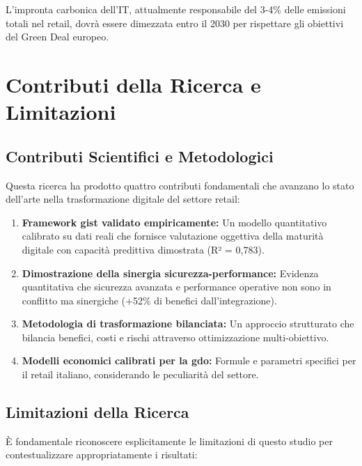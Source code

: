 L'impronta carbonica dell'IT, attualmente responsabile del 3-4\% delle emissioni totali nel retail, dovrà essere dimezzata entro il 2030 per rispettare gli obiettivi del Green Deal europeo.

\section{\texorpdfstring{Contributi della Ricerca e Limitazioni}{5.6 - Contributi della Ricerca e Limitazioni}}
\label{sec:5.6}

\subsection{\texorpdfstring{Contributi Scientifici e Metodologici}{5.6.1 - Contributi Scientifici e Metodologici}}
\label{subsec:5.6.1}

Questa ricerca ha prodotto quattro contributi fondamentali che avanzano lo stato dell'arte nella trasformazione digitale del settore retail:

\begin{enumerate}
\item \textbf{Framework \gls{gist} validato empiricamente:} Un modello quantitativo calibrato su dati reali che fornisce valutazione oggettiva della maturità digitale con capacità predittiva dimostrata (R² = 0,783).

\item \textbf{Dimostrazione della sinergia sicurezza-performance:} Evidenza quantitativa che sicurezza avanzata e performance operative non sono in conflitto ma sinergiche (+52\% di benefici dall'integrazione).

\item \textbf{Metodologia di trasformazione bilanciata:} Un approccio strutturato che bilancia benefici, costi e rischi attraverso ottimizzazione multi-obiettivo.

\item \textbf{Modelli economici calibrati per la \gls{gdo}:} Formule e parametri specifici per il retail italiano, considerando le peculiarità del settore.
\end{enumerate}

\subsection{\texorpdfstring{Limitazioni della Ricerca}{5.6.2 - Limitazioni della Ricerca}}
\label{subsec:5.6.2}

È fondamentale riconoscere esplicitamente le limitazioni di questo studio per contestualizzare appropriatamente i risultati:


